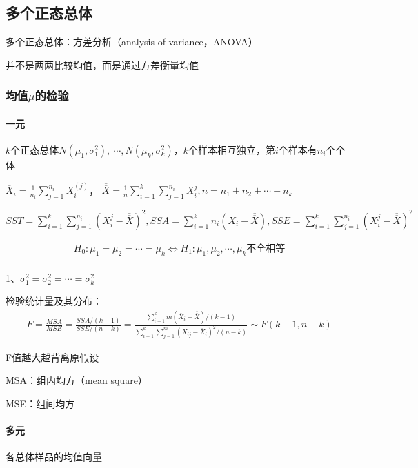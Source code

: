 \documentclass[12pt]{book}
\begin{document}
\subsection{多个正态总体}






多个正态总体：方差分析（analysis of variance，ANOVA）

并不是两两比较均值，而是通过方差衡量均值

\subsubsection{均值$\mu$的检验}

\paragraph{一元}
$k$个正态总体$N\left(\mu_1,\sigma_1^2\right),\ \cdots,N\left(\mu_k,\sigma_k^2\right)$，$k$个样本相互独立，第$i$个样本有$n_i$个个体

${\overline{X}}_i=\frac{1}{n_i}\sum_{j=1}^{n_i}X_i^{(j)}$，
$\overline{\overline{X}}=\frac{1}{n}\sum_{i=1}^{k}\sum_{j=1}^{n_i}{X_i^j},n=n_1+n_2+\cdots+n_k$

$
    SST=\sum_{i=1}^{k}\sum_{j=1}^{n_i}{\left(X_i^j-\overline{\overline{X}}\right)^2}, SSA=\sum_{i=1}^{k}n_i\left(X_i-\overline{\overline{X}}\right) , SSE=\sum_{i=1}^{k}\sum_{j=1}^{n_i}{\left(X_i^j-\overline{\overline{X}}\right)^2}
$

\begin{gather*}
    H_0:\mu_1=\mu_2=\cdots=\mu_k\Leftrightarrow H_1:\mu_1,\mu_2,\cdots,\mu_k\text{不全相等} \\
\end{gather*}


1、$\sigma_1^2=\sigma_2^2=\cdots=\sigma_k^2$

检验统计量及其分布：
\begin{gather*}
    F =\frac{MSA}{MSE} =\frac{SSA/(k-1)}{SSE/(n-k)} =\frac{\sum_{i=1}^{k}{m(\overline{X}_i-\overline{\overline{X}})/(k-1)}}{\sum_{i=1}^{k}\sum_{j=1}^{m}{(X_{ij}-\overline{X}_i)^2/(n-k)}} \sim F(k-1,n-k)
\end{gather*}

\par F值越大越背离原假设
\par MSA：组内均方（mean square）
\par MSE：组间均方

\paragraph{多元}
各总体样品的均值向量
\end{document}

